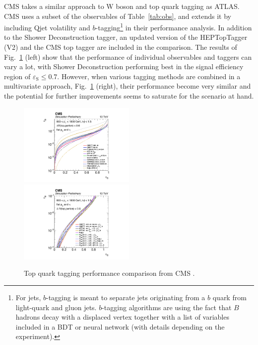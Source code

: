 CMS \cite{CMS:2016tvk, Khachatryan:2014vla} takes a similar approach
to W boson and top quark tagging as ATLAS. CMS uses a subset of the
observables of Table~\ref{tab:obs}, and extends it by including Qjet
volatility \cite{Ellis:2012sn} and $b$-tagging\footnote{For jets,
  $b$-tagging is meant to separate jets originating from a $b$ quark
  from light-quark and gluon jets. $b$-tagging algorithms are using
  the fact that $B$ hadrons decay with a displaced vertex together
  with a list of variables included in a BDT or neural network (with
  details depending on the experiment).} in their performance
analysis. In addition to the Shower Deconstruction tagger, an updated
version of the HEPTopTagger (V2) and the CMS top tagger are included
in the comparison. The results of Fig.~\ref{fig:roc_tag_cms} (left)
show that the performance of individual observables and taggers can
vary a lot, with Shower Deconstruction performing best in the signal
efficiency region of $\varepsilon_\mathrm{S} \leq 0.7$. However, when
various tagging methods are combined in a multivariate approach,
Fig.~\ref{fig:roc_tag_cms} (right), their performance become very
similar and the potential for further improvements seems to saturate
for the scenario at hand.
%
\begin{figure}
 \includegraphics[width=0.5\textwidth]{figures/cms_top1_roc.pdf}
  \includegraphics[width=0.5\textwidth]{figures/cms_top2_roc.pdf}
  \caption{Top quark tagging performance comparison from CMS \cite{CMS:2016tvk}.}\label{fig:roc_tag_cms}
\end{figure}
%
